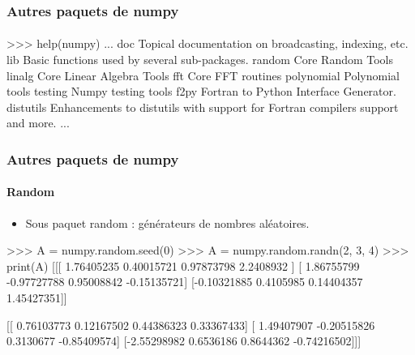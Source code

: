 \begin{frame}[fragile]
\frametitle{Autres paquets de numpy}
\framesubtitle{}
\begin{pythonConsole}
>>> help(numpy)
...
    doc
        Topical documentation on broadcasting, indexing, etc.
    lib
        Basic functions used by several sub-packages.
    random
        Core Random Tools
    linalg
        Core Linear Algebra Tools
    fft
        Core FFT routines
    polynomial
        Polynomial tools
    testing
        Numpy testing tools
    f2py
        Fortran to Python Interface Generator.
    distutils
        Enhancements to distutils with support for
        Fortran compilers support and more.
...
\end{pythonConsole}
\end{frame}
\begin{frame}[fragile]
\frametitle{Autres paquets de numpy}
\framesubtitle{Random}
\begin{itemize}
 \item Sous paquet random : générateurs de nombres aléatoires. 
\end{itemize}
\begin{pythonConsole}
>>> A = numpy.random.seed(0)
>>> A = numpy.random.randn(2, 3, 4)
>>> print(A)
[[[ 1.76405235  0.40015721  0.97873798  2.2408932 ]
  [ 1.86755799 -0.97727788  0.95008842 -0.15135721]
  [-0.10321885  0.4105985   0.14404357  1.45427351]]

 [[ 0.76103773  0.12167502  0.44386323  0.33367433]
  [ 1.49407907 -0.20515826  0.3130677  -0.85409574]
  [-2.55298982  0.6536186   0.8644362  -0.74216502]]]
\end{pythonConsole}
\end{frame}
